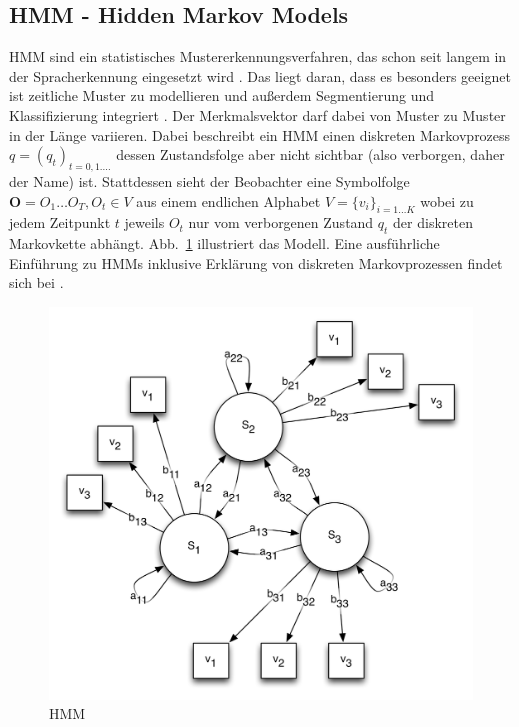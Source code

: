 \subsection[HMM]{HMM - Hidden Markov Models} \label{sub:hmm}

\ac{HMM} sind ein statistisches Mustererkennungsverfahren, das schon seit langem in der Spracherkennung eingesetzt wird \cite{Rabiner:1989p11574}. Das liegt daran, dass es besonders geeignet ist zeitliche Muster zu modellieren und außerdem Segmentierung und Klassifizierung integriert \cite{Kosmala:1998p11691}. Der Merkmalsvektor darf dabei von Muster zu Muster in der Länge variieren.
Dabei beschreibt ein HMM einen diskreten Markovprozess $q=(q_t)_{t=0,1.\dots}$ dessen Zustandsfolge aber nicht sichtbar (also verborgen, daher der Name) ist. Stattdessen sieht der Beobachter eine Symbolfolge $\mathbf{O}=O_1\dots O_T, O_t\in V$ aus einem endlichen Alphabet $V=\{v_i\}_{i=1\dots K}$ wobei zu jedem Zeitpunkt $t$ jeweils $O_t$ nur vom verborgenen Zustand $q_t$ der diskreten Markovkette abhängt. Abb.~\ref{fig:hmm} illustriert das Modell. Eine ausführliche Einführung zu HMMs inklusive Erklärung von diskreten Markovprozessen findet sich bei \citet{Rabiner:1989p11574}. 

\begin{figure}
  \centering \includegraphics[width=\textwidth]{figures/hmm.png}
  \caption{HMM}
  \label{fig:hmm}
\end{figure}


